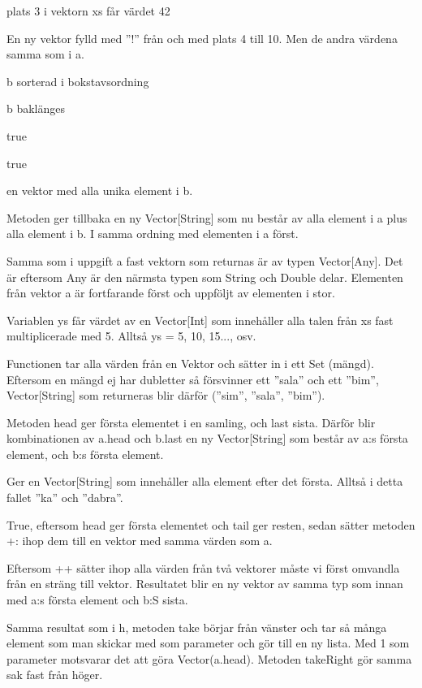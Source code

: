 \Subtask  plats 3 i vektorn xs får värdet 42

\Subtask  En ny vektor fylld med ''!'' från och med plats 4 till 10. Men de andra värdena samma som i a.

\Subtask  b sorterad i bokstavsordning

\Subtask  b baklänges

\Subtask  true

\Subtask  true

\Subtask  en vektor med alla unika element i b.

\Task %

\Subtask
Metoden ger tillbaka en ny Vector[String] som nu består av alla element i a plus alla element i b. I samma ordning med elementen i a först.

\Subtask
Samma som i uppgift a fast vektorn som returnas är av typen Vector[Any]. Det är eftersom Any är den närmsta typen som String och Double delar. Elementen från vektor a är fortfarande först och uppföljt av elementen i stor.

\Subtask
Variablen ys får värdet av en Vector[Int] som innehåller alla talen från xs fast multiplicerade med 5. Alltså ys = 5, 10, 15..., osv.

\Subtask
Functionen tar alla värden från en Vektor och sätter in i ett Set (mängd). Eftersom en mängd ej har dubletter så försvinner ett ''sala'' och ett ''bim'', Vector[String] som returneras blir därför (''sim'', ''sala'', ''bim'').

\Subtask
Metoden head ger första elementet i en samling, och last sista. Därför blir kombinationen av a.head och b.last en ny Vector[String] som består av a:s första element, och b:s första element.

\Subtask
Ger en Vector[String] som innehåller alla element efter det första. Alltså i detta fallet ''ka'' och ''dabra''.

\Subtask
True, eftersom head ger första elementet och tail ger resten, sedan sätter metoden +: ihop dem till en vektor med samma värden som a.

\Subtask
Eftersom ++ sätter ihop alla värden från två vektorer måste vi först omvandla från en sträng till vektor. Resultatet blir en ny vektor av samma typ som innan med a:s första element och b:S sista.

\Subtask
Samma resultat som i h, metoden take börjar från vänster och tar så många element som man skickar med som parameter och gör till en ny lista. Med 1 som parameter motsvarar det att göra Vector(a.head). Metoden takeRight gör samma sak fast från höger.

